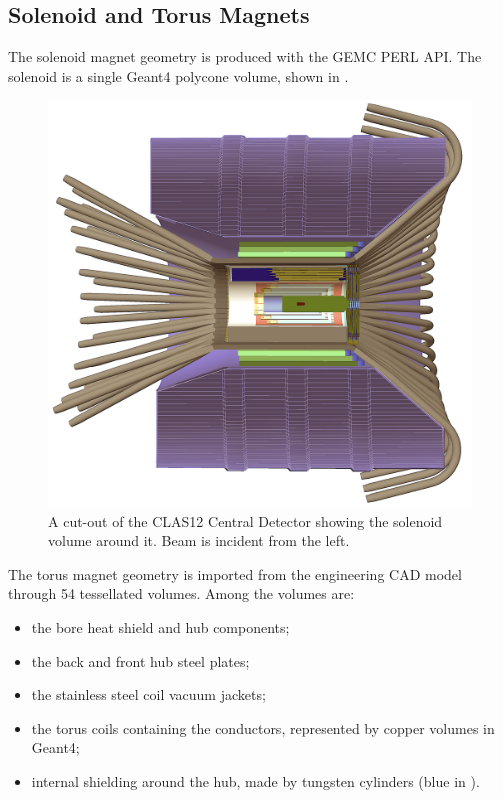 \subsection{Solenoid and Torus Magnets}

The solenoid magnet geometry is produced with the GEMC PERL API. The solenoid is a single Geant4 polycone volume, shown in .
\begin{figure}[h]
	\centering
	\includegraphics[width=0.99\columnwidth,keepaspectratio]{img/solenoid.png}
    \caption{A cut-out of the CLAS12 Central Detector showing the solenoid volume around it. Beam is incident from the left.}
	\label{fig:solenoid}
\end{figure}

The torus magnet geometry is imported from the engineering CAD model through 54 tessellated volumes. Among the volumes are:

\begin{itemize}
	\item the bore heat shield and hub components;
	\item the back and front hub steel plates;
	\item the stainless steel coil vacuum jackets;
	\item the torus coils containing the conductors, represented by copper volumes in Geant4;
	\item internal shielding around the hub, made by tungsten cylinders (blue in ).
\end{itemize}

